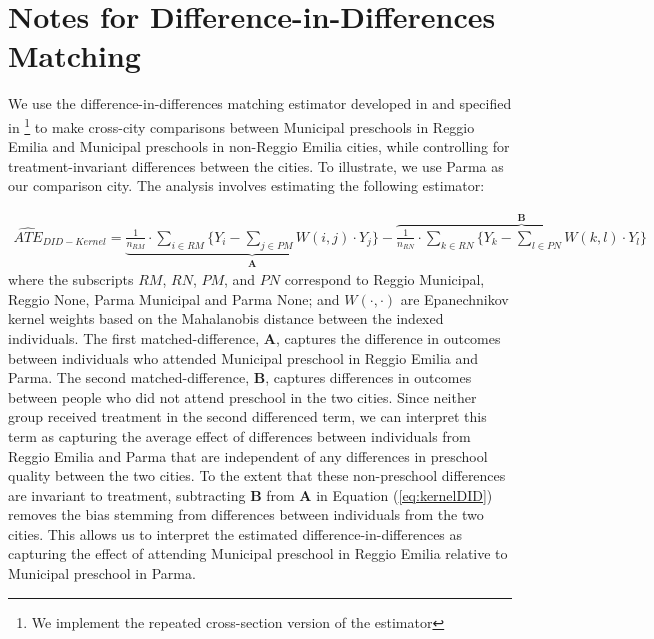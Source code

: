





\section{Notes for Difference-in-Differences Matching}

We use the difference-in-differences matching estimator developed in \cite{Heckman_Ichimura_etal_1998_Econometrica} and specified in \cite{Smith_Todd_2005_JOE} \footnote{We implement the repeated cross-section version of the estimator} to make cross-city comparisons between Municipal preschools in Reggio Emilia and Municipal preschools in non-Reggio Emilia cities, while controlling for treatment-invariant differences between the cities. To illustrate, we use Parma as our comparison city. The analysis involves estimating the following estimator:

\begin{align} \label{eq:kernelDID}
\widehat{ATE}_{DID-Kernel} = \underbrace{\frac{1}{n_{RM}} \cdot \sum_{i \in RM} \bigg\{ Y_i - \sum_{j \in PM} W(i,j) \cdot Y_j \bigg\}}_{\textbf{A}} - \overbrace{\frac{1}{n_{RN}} \cdot \sum_{k \in RN} \bigg\{ Y_k - \sum_{l \in PN} W(k,l) \cdot Y_l \bigg\}}^{\textbf{B}}
\end{align}
where the subscripts $RM$, $RN$, $PM$, and $PN$ correspond to Reggio Municipal, Reggio None, Parma Municipal and Parma None; and $W(\cdot,\cdot)$ are Epanechnikov kernel weights based on the Mahalanobis distance between the indexed individuals. The first matched-difference, \textbf{A}, captures the difference in outcomes between individuals who attended Municipal preschool in Reggio Emilia and Parma. The second matched-difference, \textbf{B}, captures differences in outcomes between people who did not attend preschool in the two cities. Since neither group received treatment in the second differenced term, we can interpret this term as capturing the average effect of differences between individuals from Reggio Emilia and Parma that are independent of any differences in preschool quality between the two cities. To the extent that these non-preschool differences are invariant to treatment, subtracting \textbf{B} from \textbf{A} in Equation (\ref{eq:kernelDID}) removes the bias stemming from differences between individuals from the two cities. This allows us to interpret the estimated difference-in-differences as capturing the effect of attending Municipal preschool in Reggio Emilia relative to Municipal preschool in Parma.







